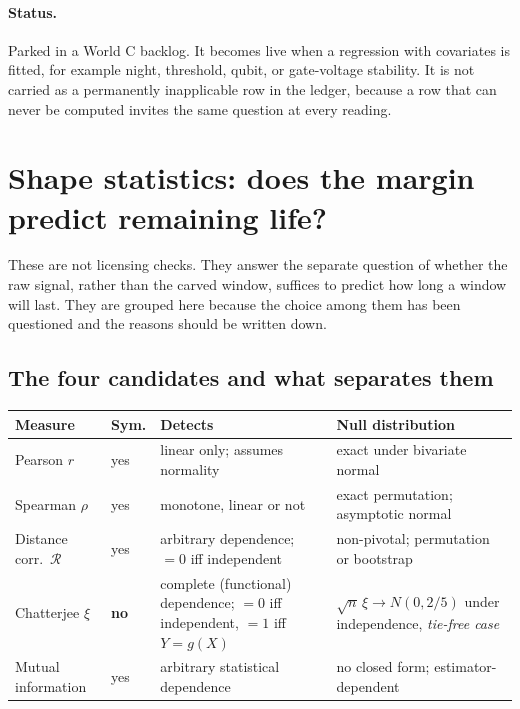 \documentclass[11pt,a4paper]{article}
\begin{document}
\paragraph{Status.} Parked in a World C backlog. It becomes live when a regression with
covariates is fitted, for example night, threshold, qubit, or gate-voltage stability. It
is not carried as a permanently inapplicable row in the ledger, because a row that can
never be computed invites the same question at every reading.

\section{Shape statistics: does the margin predict remaining life?}

These are not licensing checks. They answer the separate question of whether the raw
signal, rather than the carved window, suffices to predict how long a window will last.
They are grouped here because the choice among them has been questioned and the reasons
should be written down.

\subsection{The four candidates and what separates them}

\begin{center}
\small
\begin{tabular}{@{}p{}p{}p{}p{}@{}}
\toprule
\textbf{Measure} & \textbf{Sym.} & \textbf{Detects} & \textbf{Null distribution}\\
\midrule
Pearson $r$ & yes & linear only; assumes normality & exact under bivariate normal\\
Spearman $\rho$ & yes & monotone, linear or not & exact permutation; asymptotic normal\\
Distance corr.\ $\mathcal{R}$ & yes & arbitrary dependence; $=0$ iff independent &
non-pivotal; permutation or bootstrap\\
Chatterjee $\xi$ & \textbf{no} & complete (functional) dependence; $=0$ iff independent,
$=1$ iff $Y = g(X)$ &
$\sqrt{n}\,\xi \to N(0, 2/5)$ under independence, \emph{tie-free case}\\
Mutual information & yes & arbitrary statistical dependence &
no closed form; estimator-dependent\\
\bottomrule
\end{tabular}
\end{center}
\end{document}

